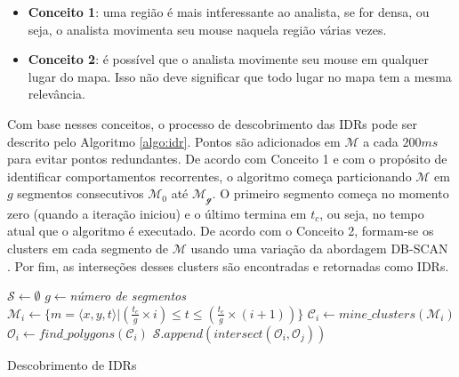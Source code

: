 \begin{itemize}
	\item \textbf{Conceito 1}: uma região é mais intferessante ao analista, se for densa, ou seja, o analista movimenta seu mouse naquela região várias vezes.
	\item \textbf{Conceito 2}: é possível que o analista movimente seu mouse em qualquer lugar do mapa. Isso não deve significar que todo lugar no mapa tem a mesma relevância.
\end{itemize}

Com base nesses conceitos, o processo de descobrimento das IDRs pode ser descrito pelo Algoritmo \ref{algo:idr}. Pontos são adicionados em $\mathcal{M}$ a cada $200ms$ para evitar pontos redundantes. De acordo com Conceito 1 e com o propósito de identificar comportamentos recorrentes, o algoritmo começa particionando $\mathcal{M}$ em $g$ segmentos consecutivos $\mathcal{M_0}$ até $\mathcal{M_g}$. O primeiro segmento começa no momento zero (quando a iteração iniciou) e o último termina em $t_c$, ou seja, no tempo atual que o algoritmo é executado. De acordo com o Conceito 2, formam-se os clusters em cada segmento de $\mathcal{M}$ usando uma variação da abordagem DB-SCAN \cite{Ester:1996}. Por fim, as interseções desses clusters são encontradas e retornadas como IDRs.

\begin{algorithm}[t]
	\DontPrintSemicolon
	$\mathcal{S} \gets \emptyset$\;
	$g \gets ${\em número de segmentos}\;
	{
		   $\mathcal{M}_i \gets \{m = \langle x,y,t \rangle | (\frac{t_c}{g} \times i) \leq t \leq (\frac{t_c}{g} \times (i+1))\}$\;
		   $\mathcal{C}_i \gets \mathit{mine\_clusters}(\mathcal{M}_i)$\label{ln:mine}\;
		   $\mathcal{O}_i \gets \mathit{find\_polygons}(\mathcal{C}_i)$\label{ln:poly}\;
	}
	{
		   $\mathcal{S}.\mathit{append}(\mathit{intersect}(\mathcal{O}_i, \mathcal{O}_j))$
	}
	\; 
	\caption{Descobrimento de IDRs}
	\label{algo:idr}
\end{algorithm}

